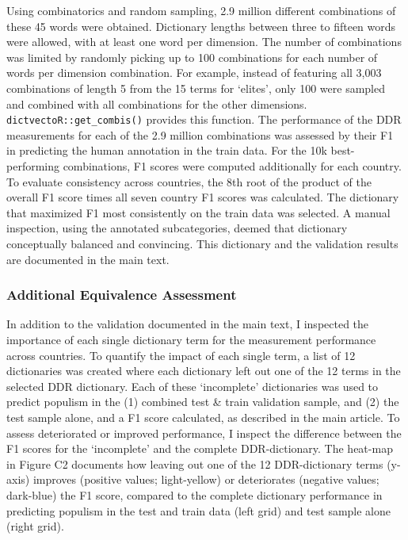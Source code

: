 \documentclass[
]{ccr}
\begin{document}
Using combinatorics and random sampling, 2.9 million different
combinations of these 45 words were obtained. Dictionary lengths between
three to fifteen words were allowed, with at least one word per
dimension. The number of combinations was limited by randomly picking up
to 100 combinations for each number of words per dimension combination.
For example, instead of featuring all 3,003 combinations of length 5
from the 15 terms for `elites', only 100 were sampled and combined with
all combinations for the other dimensions.
\texttt{dictvectoR::get\_combis()} provides this function. The
performance of the DDR measurements for each of the 2.9 million
combinations was assessed by their F1 in predicting the human annotation
in the train data. For the 10k best-performing combinations, F1 scores
were computed additionally for each country. To evaluate consistency
across countries, the 8th root of the product of the overall F1 score
times all seven country F1 scores was calculated. The dictionary that
maximized F1 most consistently on the train data was selected. A manual
inspection, using the annotated subcategories, deemed that dictionary
conceptually balanced and convincing. This dictionary and the validation
results are documented in the main text.

\hypertarget{additional-equivalence-assessment}{%
\subsubsection{Additional Equivalence
Assessment}\label{additional-equivalence-assessment}}

In addition to the validation documented in the main text, I inspected
the importance of each single dictionary term for the measurement
performance across countries. To quantify the impact of each single
term, a list of 12 dictionaries was created where each dictionary left
out one of the 12 terms in the selected DDR dictionary. Each of these
`incomplete' dictionaries was used to predict populism in the (1)
combined test \& train validation sample, and (2) the test sample alone,
and a F1 score calculated, as described in the main article. To assess
deteriorated or improved performance, I inspect the difference between
the F1 scores for the `incomplete' and the complete DDR-dictionary. The
heat-map in Figure C2 documents how leaving out one of the 12
DDR-dictionary terms (y-axis) improves (positive values; light-yellow)
or deteriorates (negative values; dark-blue) the F1 score, compared to
the complete dictionary performance in predicting populism in the test
and train data (left grid) and test sample alone (right grid).
\end{document}
